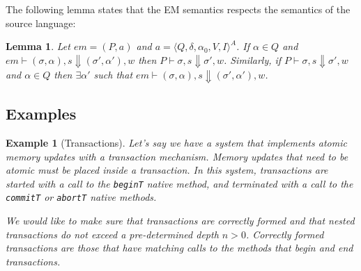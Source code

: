 \documentclass[10pt,notitlepage,twoside]{article}
\newcommand{\aut}{a}
\newcommand{\automata}[5]{\langle #1,#2,#3,#4,#5 \rangle^A}
\newcommand{\qu}{\alpha}
\newcommand{\theautomaton}{\automata{Q}{\delta}{\qu_0}{V}{I}}
\newcommand{\emdef}[2]{(#1,#2)}
\newcommand{\eval}[2]{P \vdash #1 \Downarrow #2}
\newtheorem{lemma}{Lemma}
\newtheorem{example}{Example}
\begin{document}
The following lemma states that the EM semantics respects the semantics of the source language:

\begin{lemma}
Let $em = \emdef{P}{\aut}$ and $\aut = \theautomaton$.
If $\qu \in Q$ and $em \vdash (\sigma,\qu),s \Downarrow (\sigma',\qu'),w$ then $\eval{\sigma,s}{\sigma',w}$. Similarly, if $\eval{\sigma,s}{\sigma',w}$ and $\qu \in Q$ then $\exists \qu'$ such that $em \vdash (\sigma,\qu),s \Downarrow (\sigma',\qu'),w$.
\end{lemma}

\subsection{Examples}

\begin{example}[Transactions]   
Let's say we have a system that implements atomic memory updates with a transaction mechanism. Memory updates that need to be atomic must be placed inside a transaction. In this system, transactions are started with a call to the \texttt{beginT} native method, and terminated with a call to the \texttt{commitT}  or \texttt{abortT} native methods.

We would like to make sure that transactions are correctly formed and that nested transactions do not exceed a pre-determined depth $n > 0$. Correctly formed transactions are those that have matching calls to the methods that begin and end transactions.


\end{example}
\end{document}
